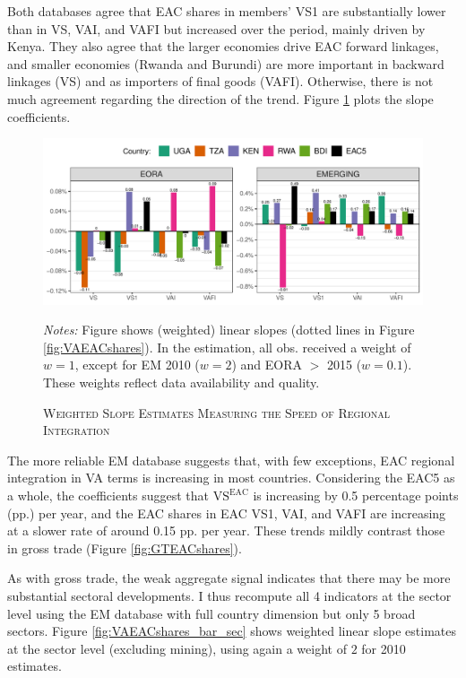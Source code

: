 \documentclass[a4paper]{article}
\begin{document}
Both databases agree that EAC shares in members' VS1 are substantially lower than in VS, VAI, and VAFI but increased over the period, mainly driven by Kenya. They also agree that the larger economies drive EAC forward linkages, and smaller economies (Rwanda and Burundi) are more important in backward linkages (VS) and as importers of final goods (VAFI). Otherwise, there is not much agreement regarding the direction of the trend. Figure \ref{fig:VAEACshares_bar} plots the slope coefficients.


\begin{figure}[h!] \vspace{-1mm}
\centering
\caption{\label{fig:VAEACshares_bar}\textsc{Weighted Slope Estimates Measuring the Speed of Regional Integration}}
\includegraphics[width=1\textwidth, trim= {0 0 0 0}, clip]{"Figures/VA_EAC5_shares_slope_bar.pdf"} \\ 
\raggedright
\scriptsize
\emph{Notes:} Figure shows (weighted) linear slopes (dotted lines in Figure \ref{fig:VAEACshares}). In the estimation, all obs. received a weight of $w=1$, except for EM 2010 ($w=2$) and EORA $>$ 2015 ($w=0.1$). These weights reflect data availability and quality.  
 \vspace{-4mm}
\end{figure}
\FloatBarrier

 The more reliable EM database suggests that, with few exceptions, EAC regional integration in VA terms is increasing in most countries. Considering the EAC5 as a whole, the coefficients suggest that $\text{VS}^\text{EAC}$ is increasing by 0.5 percentage points (pp.) per year, and the EAC shares in EAC VS1, VAI, and VAFI are increasing at a slower rate of around 0.15 pp. per year. These trends mildly contrast those in gross trade (Figure \ref{fig:GTEACshares}). \newline

As with gross trade, the weak aggregate signal indicates that there may be more substantial sectoral developments. I thus recompute all 4 indicators at the sector level using the EM database with full country dimension but only 5 broad sectors. Figure \ref{fig:VAEACshares_bar_sec} shows weighted linear slope estimates at the sector level (excluding mining), using again a weight of $2$ for 2010 estimates. 
\end{document}

